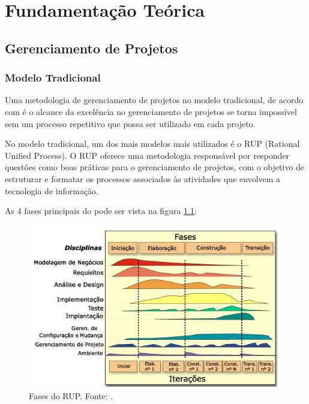 \chapter[Fundamentação Teórica]{Fundamentação Teórica}
\label{cp:fundamentacao}

\section{Gerenciamento de Projetos}

\subsection{Modelo Tradicional}

Uma metodologia de gerenciamento de projetos no modelo tradicional, de acordo com \cite{kerzner} é o alcance da excelência no gerenciamento de projetos se torna impossível sem um processo repetitivo que possa ser utilizado em cada projeto.

No modelo tradicional, um dos mais modelos mais utilizados é o RUP (Rational Unified Process). O RUP oferece uma metodologia responsável por responder questões como boas práticas para o gerenciamento de projetos, com o objetivo de estruturar e formatar os processos associados às atividades que envolvem a tecnologia de informação. 

As 4 fases principais do \cite{rup} pode ser vista na figura \ref{img:fases_do_rup}:

\begin{figure}[H]
	\centering
	\includegraphics[width=1.0\textwidth]{figuras/fases_rup.jpg}
	\caption{Fases do RUP. Fonte: \cite{rup}.}
	\label{img:fases_do_rup}
\end{figure}

